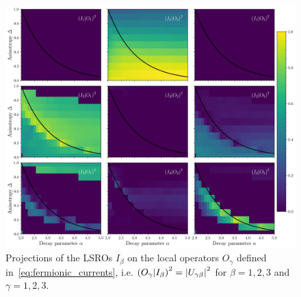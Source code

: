\begin{figure}[htbp]
  \centering
  \includegraphics[width=\linewidth]{Figures/projections.jpg}
  \caption{Projections of the LSROs \(I_{\beta}\) on the local operators \(O_{\gamma}\) defined in~\eqref{eq:fermionic_currents},
    i.e. \(\left(O_{\gamma} \middle| I_{\beta}\right)^2 = \abs{U_{\gamma\beta}}^2\) for \(\beta = 1,2,3\) and \(\gamma = 1,2,3\).}
  \label{fig:projections}
\end{figure}

